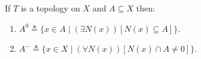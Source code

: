 If $T$ is a topology on $X$ and $A \subseteq X$ then:
\begin{enumerate}
\item $A^0 \triangleq \{x \in A \mid (\exists N(x))[N(x) \subseteq A]\}$.
\item $A^- \triangleq \{x \in X \mid (\forall N(x))[N(x) \cap A \neq 0]\}$.
\end{enumerate}
